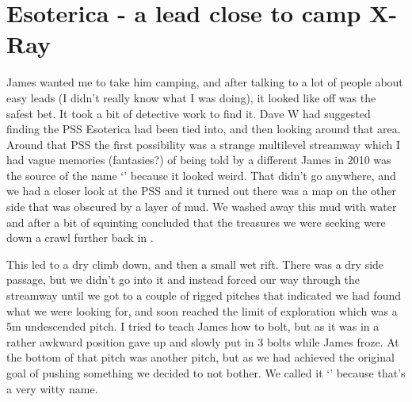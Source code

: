 \section{Esoterica - a lead close to camp X-Ray}




James wanted me to take him camping, and after talking to a lot of people about easy leads (I didn't really know what I was doing), it looked like  off  was the safest bet. It took a bit of detective work to find it. Dave W had suggested finding the PSS Esoterica had been tied into, and then looking around that area. Around that PSS the first possibility was a strange multilevel streamway which I had vague memories (fantasies?) of being told by a different James in 2010 was the source of the name `' because it looked weird. That didn't go anywhere, and we had a closer look at the PSS and it turned out there was a map on the other side that was obscured by a layer of mud. We washed away this mud with water and after a bit of squinting concluded that the treasures we were seeking were down a crawl further back in . 

This led to a dry climb down, and then a small wet rift. There was a dry side passage, but we didn't go into it and instead forced our way through the streamway until we got to a couple of rigged pitches that indicated we had found what we were looking for, and soon reached the limit of exploration which was a 5m undescended pitch. I tried to teach James how to bolt, but as it was in a rather awkward position gave up and slowly put in 3 bolts while James froze. At the bottom of that pitch was another pitch, but as we had achieved the original goal of pushing something we decided to not bother. We called it `' because that's a very witty name. 

